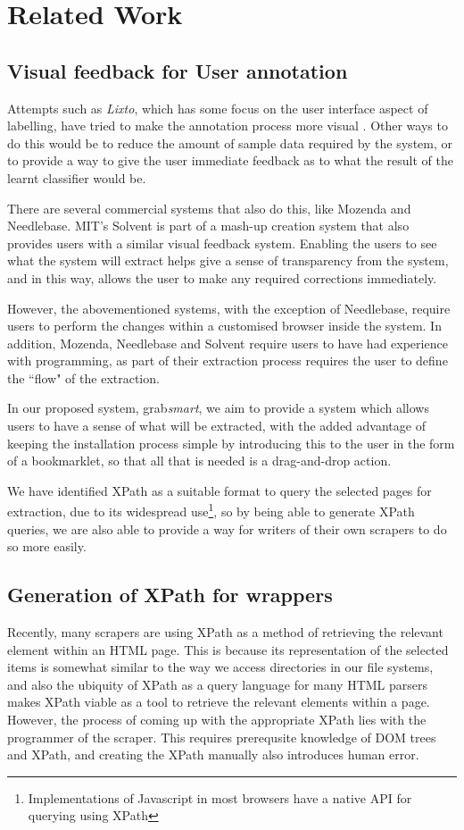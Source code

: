 \section{Related Work}
\label{section:relatedwork}

\subsection{Visual feedback for User annotation}
 Attempts such as
\textit{Lixto}, which has some focus on the user interface aspect of labelling, have tried to
make the annotation process more visual \cite{Baumgartner2001}. Other ways to do this would be to reduce
the amount of sample data required by the system, or to provide a way to give the user
immediate feedback as to what the result of the learnt classifier would be.

There are several commercial systems that also do this, like Mozenda and Needlebase. %
MIT's Solvent is part of a mash-up creation system that also provides users with a similar
visual feedback system. Enabling the users to see what the system will extract helps give a
sense of transparency from the system, and in this way, allows the user to make any required
corrections immediately.

However, the abovementioned systems, with the exception of Needlebase, require users to perform
the changes within a customised browser inside the system. In addition, Mozenda, Needlebase and
Solvent require users to have had experience with programming, as part of their extraction
process requires the user to define the ``flow" of the extraction.


In our proposed system, grab\textit{smart}, we aim to provide a system which allows users to have a
sense of what will be extracted, with the added advantage of keeping the installation process
simple by introducing this to the user in the form of a bookmarklet, so that all that is needed
is a drag-and-drop action.

We have identified XPath as a suitable format to query the selected pages for extraction,
due to its widespread use\footnote{Implementations of Javascript in most browsers have
a native API for querying using XPath}, so by being able to generate XPath queries,
we are also able to provide a way for writers of their own scrapers to do so more easily.


\subsection{Generation of XPath for wrappers}
Recently, many scrapers are using XPath as a method of retrieving the relevant
element within an HTML page. This is because its representation of the selected items is
somewhat similar to the way we access directories in our file systems, and also the ubiquity of
XPath as a query language for many HTML parsers makes XPath viable as a tool to retrieve the
relevant elements within a page. However, the process of coming up with the appropriate XPath
lies with the programmer of the scraper. This requires prerequsite knowledge of DOM trees and
XPath, and creating the XPath manually also introduces human error.
	
